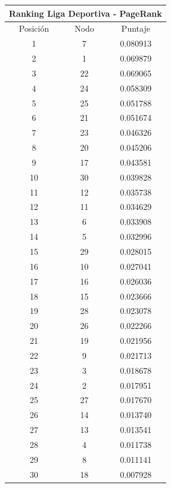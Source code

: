 			\begin{center}
      			\begin{tabular}{|c|c|c|} 
		      		\hline
		  				\multicolumn{3}{c}{Ranking Liga Deportiva - PageRank} \\
		 			\hline
        			Posición & Nodo & Puntaje \\ \hline
         			1 & 7 & 0.080913 \\
        			2 & 1 & 0.069879 \\
        			3 & 22 & 0.069065 \\
        			4 & 24 & 0.058309 \\
        			5 & 25 & 0.051788 \\
        			6 & 21 & 0.051674 \\
        			7 & 23 & 0.046326 \\
        			8 & 20 & 0.045206 \\
        			9 & 17 & 0.043581 \\
        			10 & 30 & 0.039828 \\
        			11 & 12 & 0.035738 \\
        			12 & 11 & 0.034629 \\
        			13 & 6 & 0.033908 \\
        			14 & 5 & 0.032996 \\
        			15 & 29 & 0.028015 \\
        			16 & 10 & 0.027041 \\
        			17 & 16 & 0.026036 \\
   					18 & 15 & 0.023666 \\
   					19 & 28 & 0.023078 \\
   					20 & 26 & 0.022266 \\
   					21 & 19 & 0.021956 \\
   					22 & 9 & 0.021713 \\
  					23 & 3 & 0.018678 \\
   					24 & 2 & 0.017951 \\
   					25 & 27 & 0.017670 \\
   					26 & 14 & 0.013740 \\
   					27 & 13 & 0.013541 \\
   					28 & 4 & 0.011738 \\
   					29 & 8 & 0.011141 \\
   					30 & 18 & 0.007928 


\end{tabular}
\end{center}
